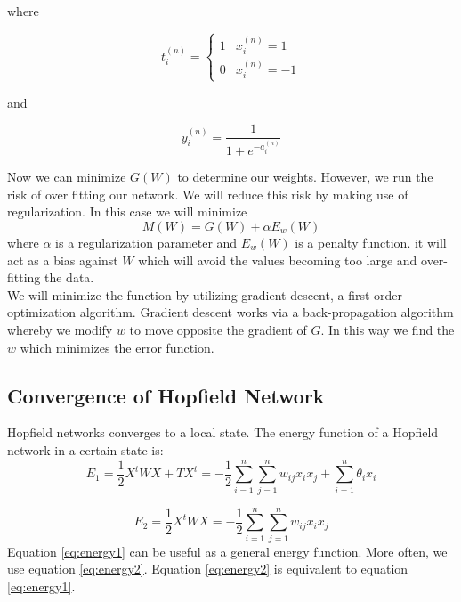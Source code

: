 where

\begin{equation}
\label{eq:opt2}
t_{i}^{(n)} = \begin{cases}
          1 & x_{i}^{(n)} = 1\\
          0 & x_{i}^{(n)} = -1
        \end{cases}
\end{equation}

and

\begin{equation}
\label{eq:opt3}
y_{i}^{(n)} = \frac{1}{1 + e^{-a_{i}^{(n)}}}
\end{equation}

Now we can minimize $G(W)$ to determine our weights. However, we run the risk of over fitting our network. We will reduce this risk by making use of regularization. In this case we will minimize 
\begin{equation}
\label{eq:opt4}
M(W) = G(W) + \alpha E_w(W)
\end{equation}
where $\alpha$ is a regularization parameter and $E_w(W)$ is a penalty function. it will act as a bias against $W$ which will avoid the values becoming too large and over-fitting the data\cite{bib:statics}.\\

We will minimize the function by utilizing gradient descent, a first order optimization algorithm. Gradient descent works via a back-propagation algorithm whereby we modify $w$ to move opposite the gradient of $G$. In this way we find the $w$ which minimizes the error function.


\subsection{Convergence of Hopfield Network}
Hopfield networks converges to a local state. The energy function of a Hopfield network in a certain state is:
\begin{equation}
\label{eq:energy1}
E_1 = \frac{1}{2}X^tWX + TX^t = - \frac{1}{2}\sum_{i = 1}^{n}\sum_{j = 1}^{n}w_{ij} x_i x_j + \sum_{i = 1}^n \theta_i x_i
\end{equation}

\begin{equation}
\label{eq:energy2}
E_2 = \frac{1}{2}X^tWX = - \frac{1}{2}\sum_{i = 1}^{n}\sum_{j = 1}^{n}w_{ij} x_i x_j
\end{equation}
Equation \ref{eq:energy1} can be useful as a general energy function. More often, we use equation \ref{eq:energy2}. Equation \ref{eq:energy2} is equivalent to equation \ref{eq:energy1}.\\

